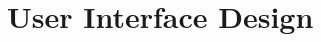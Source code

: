 \documentclass{hasel_thesis}
\begin{document}
\section{User Interface Design} \label{interface}

\end{document}
